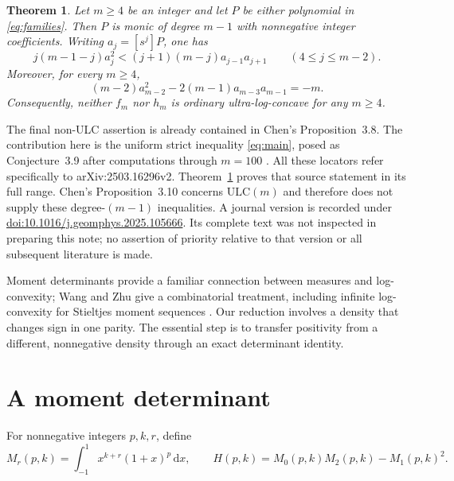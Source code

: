 \documentclass[11pt]{article}
\newtheorem{theorem}{Theorem}
\newcommand{\dd}{\,\mathrm{d}}
\newcommand{\ULC}{\mathrm{ULC}}
\begin{document}
\begin{theorem}\label{thm:main}
Let $m\ge4$ be an integer and let $P$ be either polynomial in
\eqref{eq:families}. Then $P$ is monic of degree $m-1$ with nonnegative
integer coefficients. Writing $a_j=[s^j]P$, one has
\begin{equation}\label{eq:main}
 j(m-1-j)a_j^2<(j+1)(m-j)a_{j-1}a_{j+1}
 \qquad(4\le j\le m-2).
\end{equation}
Moreover, for every $m\ge4$,
\begin{equation}\label{eq:endpoint-statement}
 (m-2)a_{m-2}^2-2(m-1)a_{m-3}a_{m-1}=-m.
\end{equation}
Consequently, neither $f_m$ nor $h_m$ is ordinary ultra-log-concave
for any $m\ge4$.
\end{theorem}

The final non-ULC assertion is already contained in Chen's
Proposition~3.8. The contribution here is the uniform strict inequality
\eqref{eq:main}, posed as Conjecture~3.9 after computations through
$m=100$ \cite[p.~16]{Chen2025}. All these locators refer specifically
to arXiv:2503.16296v2. Theorem~\ref{thm:main} proves that source statement
in its full range. Chen's Proposition~3.10 concerns $\ULC(m)$ and
therefore does not supply these degree-$(m-1)$ inequalities.
A journal version is recorded under
\href{https://doi.org/10.1016/j.geomphys.2025.105666}{doi:10.1016/j.geomphys.2025.105666}.
Its complete text was not inspected in preparing this note; no assertion
of priority relative to that version or all subsequent literature is made.

Moment determinants provide a familiar connection between measures and
log-convexity; Wang and Zhu give a combinatorial treatment, including
infinite log-convexity for Stieltjes moment sequences
\cite[Sections~1--2]{WangZhu2016}. Our reduction involves a density that
changes sign in one parity. The essential step is to transfer positivity
from a different, nonnegative density through an exact determinant identity.

\section{A moment determinant}

For nonnegative integers $p,k,r$, define
\begin{equation}\label{eq:moments}
 M_r(p,k)=\int_{-1}^{1}x^{k+r}(1+x)^p\dd x,
 \qquad H(p,k)=M_0(p,k)M_2(p,k)-M_1(p,k)^2.
\end{equation}
\end{document}
